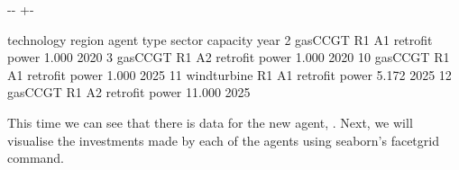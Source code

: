 \documentclass[letterpaper,10pt,english]{sphinxmanual}
\newlength\nbsphinxcodecellspacing
\begin{document}
{
\begin{sphinxVerbatim}[commandchars=\\\{\}]
\llap{\color{nbsphinxin}[19]:\,\hspace{\fboxrule}\hspace{\fboxsep}}  
  \PYG{p}{[}\PYG{p}{]}
\end{sphinxVerbatim}
}

{

\kern-\sphinxverbatimsmallskipamount\kern-\baselineskip
\kern+\FrameHeightAdjust\kern-\fboxrule
\vspace{\nbsphinxcodecellspacing}

\begin{sphinxVerbatim}[commandchars=\\\{\}]
\llap{\color{nbsphinxout}[19]:\,\hspace{\fboxrule}\hspace{\fboxsep}}     technology region agent      type sector  capacity  year
2       gasCCGT     R1    A1  retrofit  power     1.000  2020
3       gasCCGT     R1    A2  retrofit  power     1.000  2020
10      gasCCGT     R1    A1  retrofit  power     1.000  2025
11  windturbine     R1    A1  retrofit  power     5.172  2025
12      gasCCGT     R1    A2  retrofit  power    11.000  2025
\end{sphinxVerbatim}
}

This time we can see that there is data for the new agent, . Next, we will visualise the investments made by each of the agents using seaborn’s facetgrid command.
\end{document}
